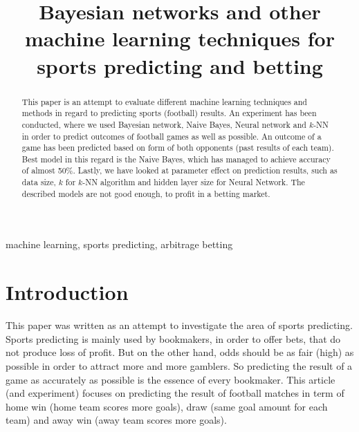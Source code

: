 \documentclass[conference]{IEEEtran}
\begin{document}
\title{Bayesian networks and other machine learning techniques for sports predicting and betting}

\author{
}


\maketitle

\begin{abstract}
This paper is an attempt to evaluate different machine learning techniques and methods in regard to predicting
sports (football) results. An experiment has been conducted, where we used Bayesian network, Naive Bayes, 
Neural network and $k$-NN in order to predict outcomes of football games as well as possible. An outcome
of a game has been predicted based on form of both opponents (past results of each team). Best model
in this regard is the Naive Bayes, which has managed to achieve accuracy of almost 50\%. Lastly, we have looked
at parameter effect on prediction results, such as data size, $k$ for $k$-NN algorithm and hidden layer size
for Neural Network. The described models are not good enough, to profit in a betting market.

\end{abstract}

\begin{IEEEkeywords}
machine learning, sports predicting, arbitrage betting
\end{IEEEkeywords}

\IEEEpeerreviewmaketitle

\section{Introduction}

This paper was written as an attempt to investigate the area of sports predicting.
Sports predicting is mainly used by bookmakers, in order to offer bets, that do 
not produce loss of profit. But on the other hand, odds should be as fair (high) as possible
in order to attract more and more gamblers. So predicting the result of a game as accurately
as possible is the essence of every bookmaker. This article (and experiment) focuses on 
predicting the result of football matches in term of home win (home team scores more goals),
draw (same goal amount for each team) and away win (away team scores more goals).
\end{document}
